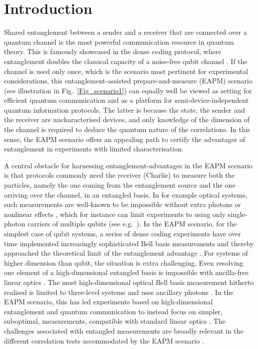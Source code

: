 \documentclass[aps,superscriptaddress,twocolumn,twoside,floatfix,pra,nofootinbib,a4paper]{revtex4-2}
\begin{document}


\section{Introduction}
Shared entanglement between a sender and a receiver that are connected over a quantum channel is the most powerful communication resource in quantum theory. This is famously showcased in the dense coding protocol, where entanglement doubles the classical capacity of a noise-free qubit channel  \cite{Bennett1992}. If the channel is used only once, which is the scenario most pertinent for experimental considerations, this entanglement-assisted prepare-and-measure (EAPM) scenario (see illustration in  Fig.~\ref{Fig_scenario1}) can equally well be viewed as setting for efficient quantum communication and as a platform for semi-device-independent quantum information protocols. The latter is because the state, the sender and the receiver are uncharacterised devices, and only knowledge of the dimension of the channel is required to deduce the quantum nature of the correlations. In this sense, the EAPM scenario offers an appealing path to certify the advantages of entanglement in experiments with limited characterisation.


A central obstacle for harnessing entanglement-advantages in the EAPM scenario is that protocols commonly need the receiver (Charlie) to measure both the particles, namely the one coming from the entanglement source and the one arriving over the channel, in an entangled basis. In for example optical systems, such measurements are well-known to be impossible without extra photons or nonlinear effects \cite{Lutkenhaus1999, Vaidman1999, Loock2004}, which for instance can limit experiments to using only single-photon carriers of multiple qubits (see e.g.~\cite{Huang2022, Guo2023}).  In the EAPM scenario, for the simplest case of qubit systems, a series of dense coding experiments have over time implemented increasingly sophisticated Bell basis measurements and thereby approached the theoretical limit of the entanglement advantage \cite{Mattle1996, Fang2000, Li2002, Jing2003, Schaetz2004, Schuck2006, Barreiro2008, Williams2017}. For systems of higher dimension than qubit,  the situation is extra challenging. Even resolving one element of a high-dimensional entangled basis is impossible with ancilla-free linear optics \cite{Calsamiglia2002}. The most high-dimensional optical Bell basis measurement hitherto realised is limited to three-level systems and uses ancillary photons \cite{Hu2020, Luo2019}.  In the EAPM scenario, this has led experiments based on high-dimensional entanglement and quantum communication to instead focus on simpler, suboptimal, measurements, compatible with standard linear optics \cite{Hu2018}. The challenges associated with entangled measurements are broadly relevant in the different correlation tests accommodated by the EAPM scenario \cite{Tavakoli2021, Pauwels2022, vieira2023interplays}.
\end{document}
